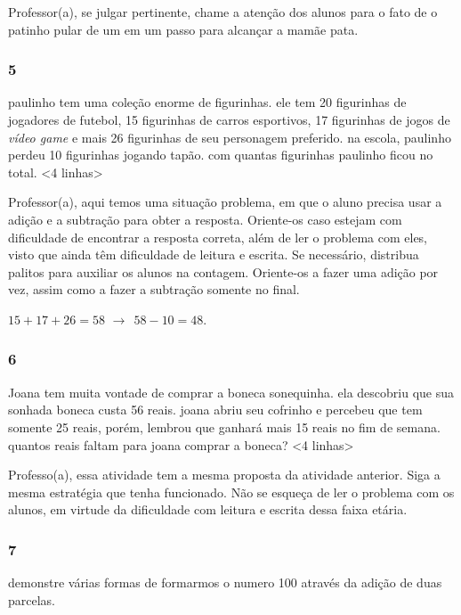 Professor(a), se julgar pertinente, chame a atenção dos alunos para o
fato de o patinho pular de um em um passo para alcançar a mamãe pata.

\subsubsection{5}\label{section-12}

paulinho tem uma coleção enorme de figurinhas. ele tem 20 figurinhas de
jogadores de futebol, 15 figurinhas de carros esportivos, 17 figurinhas
de jogos de \emph{vídeo game} e mais 26 figurinhas de seu personagem
preferido. na escola, paulinho perdeu 10 figurinhas jogando tapão. com
quantas figurinhas paulinho ficou no total. \textless{}4
linhas\textgreater{}

Professor(a), aqui temos uma situação problema, em que o aluno precisa
usar a adição e a subtração para obter a resposta. Oriente-os caso
estejam com dificuldade de encontrar a resposta correta, além de ler o
problema com eles, visto que ainda têm dificuldade de leitura e escrita.
Se necessário, distribua palitos para auxiliar os alunos na contagem.
Oriente-os a fazer uma adição por vez, assim como a fazer a subtração
somente no final.

\(15 + 17 + 26 = 58\) \(\rightarrow \ \ 58 - 10 = 48\).

\subsubsection{6}\label{section-13}

Joana tem muita vontade de comprar a boneca sonequinha. ela descobriu
que sua sonhada boneca custa 56 reais. joana abriu seu cofrinho e
percebeu que tem somente 25 reais, porém, lembrou que ganhará mais 15
reais no fim de semana. quantos reais faltam para joana comprar a
boneca? \textless{}4 linhas\textgreater{}

Professo(a), essa atividade tem a mesma proposta da atividade anterior.
Siga a mesma estratégia que tenha funcionado. Não se esqueça de ler o
problema com os alunos, em virtude da dificuldade com leitura e escrita
dessa faixa etária.

\subsubsection{7}\label{section-14}

demonstre várias formas de formarmos o numero 100 através da adição de
duas parcelas.

